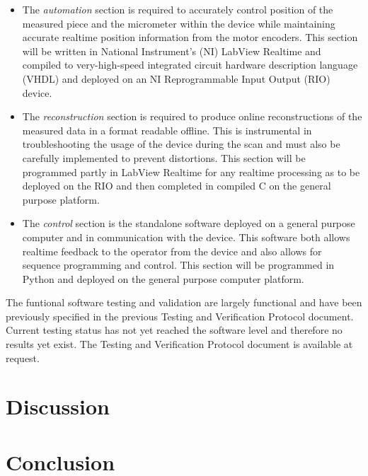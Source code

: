 \documentclass{article}
\begin{document}
\begin{itemize}
\item The \textit{automation} section is required to accurately
  control position of the measured piece and the micrometer within the
  device while maintaining accurate realtime position information from
  the motor encoders. This section will be written in National
  Instrument's (NI) LabView Realtime and compiled to very-high-speed
  integrated circuit hardware description language (VHDL) and deployed
  on an NI Reprogrammable Input Output (RIO) device.
\item The \textit{reconstruction} section is required to produce
  online reconstructions of the measured data in a format readable
  offline. This is instrumental in troubleshooting the usage of the
  device during the scan and must also be carefully implemented to
  prevent distortions. This section will be programmed partly in
  LabView Realtime for any realtime processing as to be deployed on
  the RIO and then completed in compiled C on the general purpose
  platform.
\item The \textit{control} section is the standalone software deployed
  on a general purpose computer and in communication with the
  device. This software both allows realtime feedback to the operator
  from the device and also allows for sequence programming and
  control. This section will be programmed in Python and deployed on
  the general purpose computer platform.
\end{itemize}

The funtional software testing and validation are largely functional
and have been previously specified in the previous Testing and
Verification Protocol document. Current testing status has not yet
reached the software level and therefore no results yet exist. The
Testing and Verification Protocol document is available at request.




\section{Discussion}
\label{sec:discussion}

\section{Conclusion}
\label{sec:conclusion}


\newpage
{}


\end{document}
